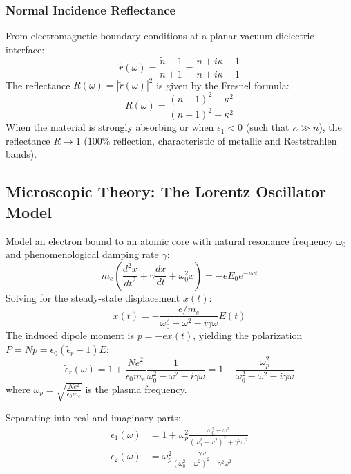 \documentclass[11pt,a4paper]{article}
\begin{document}
\subsubsection{Normal Incidence Reflectance}
From electromagnetic boundary conditions at a planar vacuum-dielectric interface:
\begin{equation}
    \tilde{r}(\omega) = \frac{\tilde{n} - 1}{\tilde{n} + 1} = \frac{n + i\kappa - 1}{n + i\kappa + 1}
\end{equation}
The reflectance $R(\omega) = |\tilde{r}(\omega)|^2$ is given by the Fresnel formula:
\begin{equation}
    R(\omega) = \frac{(n - 1)^2 + \kappa^2}{(n + 1)^2 + \kappa^2}
\end{equation}
When the material is strongly absorbing or when $\epsilon_1 < 0$ (such that $\kappa \gg n$), the reflectance $R \to 1$ ($100\%$ reflection, characteristic of metallic and Reststrahlen bands).

\subsection{Microscopic Theory: The Lorentz Oscillator Model}
\label{sec:lorentz_oscillator}
Model an electron bound to an atomic core with natural resonance frequency $\omega_0$ and phenomenological damping rate $\gamma$:
\begin{equation}
    m_e \left( \frac{d^2 x}{dt^2} + \gamma \frac{dx}{dt} + \omega_0^2 x \right) = -e E_0 e^{-i\omega t}
\end{equation}
Solving for the steady-state displacement $x(t)$:
\begin{equation}
    x(t) = -\frac{e/m_e}{\omega_0^2 - \omega^2 - i\gamma\omega} E(t)
\end{equation}
The induced dipole moment is $p = -e x(t)$, yielding the polarization $P = N p = \epsilon_0(\tilde{\epsilon}_r - 1) E$:
\begin{equation}
    \tilde{\epsilon}_r(\omega) = 1 + \frac{N e^2}{\epsilon_0 m_e} \frac{1}{\omega_0^2 - \omega^2 - i\gamma\omega} = 1 + \frac{\omega_p^2}{\omega_0^2 - \omega^2 - i\gamma\omega}
\end{equation}
where $\omega_p = \sqrt{\frac{N e^2}{\epsilon_0 m_e}}$ is the plasma frequency.

Separating into real and imaginary parts:
\begin{align}
    \epsilon_1(\omega) &= 1 + \omega_p^2 \frac{\omega_0^2 - \omega^2}{(\omega_0^2 - \omega^2)^2 + \gamma^2 \omega^2} \\
    \epsilon_2(\omega) &= \omega_p^2 \frac{\gamma\omega}{(\omega_0^2 - \omega^2)^2 + \gamma^2 \omega^2}
\end{align}
\end{document}
